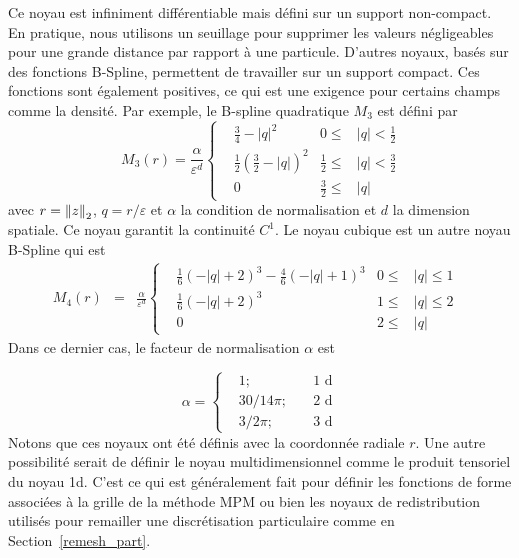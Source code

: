 Ce noyau est infiniment différentiable mais défini sur un support non-compact. En pratique, nous utilisons un seuillage pour supprimer les valeurs négligeables pour une grande distance par rapport à une particule. D'autres noyaux, basés sur des fonctions B-Spline, permettent de travailler sur un support compact. Ces fonctions sont également positives, ce qui est une exigence pour certains champs comme la densité. Par exemple, le B-spline quadratique $M_3$  est défini par
\begin{equation*}~\label{quadratic_kernel}
    M_3(r) = \frac{\alpha}{\varepsilon^d}\left\{ \begin{aligned}
         & \frac{3}{4} - |q|^2                            & 0 \leq           & |q| < \frac{1}{2} \\
         & \frac{1}{2} {\left(\frac{3}{2} - |q|\right)}^2 & \frac{1}{2} \leq & |q| < \frac{3}{2} \\
         & 0                                              & \frac{3}{2} \leq & |q|
    \end{aligned}
    \right.
\end{equation*}avec $r = \left\lVert z \right\rVert_2 $, $q = r / \varepsilon$ et $\alpha$ la condition de normalisation et $d$ la dimension spatiale. Ce noyau garantit la continuité $C^1$. Le noyau cubique est un autre noyau B-Spline qui est
\begin{eqnarray*}~\label{cubic_kernel}
    M_4(r) &=&  \frac{\alpha}{\varepsilon^d} \left\{ \begin{aligned}
         & \frac{1}{6}{(-|q|+2)}^3 - \frac{4}{6}{(-|q|+1)}^3 & 0 \leq      & |q| \leq  1 & \\
         & \frac{1}{6}{(- |q|+2)}^3                          & 1      \leq & |q| \leq 2  & \\
         & 0                                                 & 2 \leq      & |q|
    \end{aligned}
    \right.
\end{eqnarray*}Dans ce dernier cas, le facteur de normalisation $\alpha$ est

\begin{equation*}
    \alpha = \left\{ \begin{aligned}
         & 1;    \quad      & 1\text{ d} \\
         & 30/14 \pi; \quad & 2\text{ d} \\
         & 3/ 2\pi; \quad   & 3\text{ d}
    \end{aligned}
    \right.
\end{equation*}Notons que ces noyaux ont été définis avec la coordonnée radiale $r$. Une autre possibilité serait de définir le noyau multidimensionnel comme le produit tensoriel du noyau 1d. C'est ce qui est généralement fait pour définir les fonctions de forme associées à la grille de la méthode MPM ou bien les noyaux de redistribution utilisés pour remailler une discrétisation particulaire comme en Section~\ref{remesh_part}.

